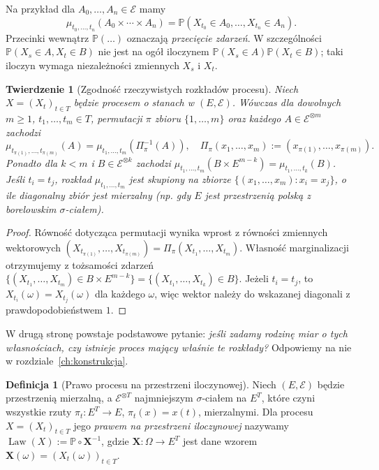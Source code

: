 \documentclass[11pt,a4paper,oneside]{report}
\numberwithin{equation}{chapter}
\theoremstyle{plain}
\newtheorem{twierdzenie}{Twierdzenie}[chapter]
\theoremstyle{definition}
\newtheorem{definicja}{Definicja}[chapter]
\theoremstyle{remark}
\newcommand{\Prob}{\mathbb{P}}
\newcommand{\Law}{\operatorname{Law}}
\newcommand{\calE}{\mathcal{E}}
\begin{document}
Na przykład dla $A_0,\ldots,A_n\in\calE$ mamy
\[
\mu_{t_0,\ldots,t_n}(A_0\times\cdots\times A_n)
=\Prob(X_{t_0}\in A_0,\ldots,X_{t_n}\in A_n).
\]
Przecinki wewnątrz $\Prob(\ldots)$ oznaczają \emph{przecięcie zdarzeń}.
W szczególności $\Prob(X_s\in A,X_t\in B)$ nie jest na ogół
iloczynem $\Prob(X_s\in A)\Prob(X_t\in B)$; taki iloczyn
wymaga niezależności zmiennych $X_s$ i $X_t$.

\begin{twierdzenie}[Zgodność rzeczywistych rozkładów procesu]
Niech $X=(X_t)_{t\in T}$ będzie procesem o stanach w $(E,\calE)$.
Wówczas dla dowolnych $m\ge1$, $t_1,\ldots,t_m\in T$,
permutacji $\pi$ zbioru $\{1,\ldots,m\}$ oraz każdego
$A\in\calE^{\otimes m}$ zachodzi
\[
\mu_{t_{\pi(1)},\ldots,t_{\pi(m)}}(A)
=\mu_{t_1,\ldots,t_m}(\Pi_\pi^{-1}(A)),
\quad
\Pi_\pi(x_1,\ldots,x_m):=(x_{\pi(1)},\ldots,x_{\pi(m)}).
\]
Ponadto dla $k<m$ i $B\in\calE^{\otimes k}$ zachodzi
$\mu_{t_1,\ldots,t_m}(B\times E^{m-k})=\mu_{t_1,\ldots,t_k}(B)$.
Jeśli $t_i=t_j$, rozkład $\mu_{t_1,\ldots,t_m}$ jest skupiony na
zbiorze $\{(x_1,\ldots,x_m):x_i=x_j\}$, o ile diagonalny zbiór jest mierzalny
(np. gdy $E$ jest przestrzenią polską z borelowskim $\sigma$-ciałem).
\end{twierdzenie}
\begin{proof}
Równość dotycząca permutacji wynika wprost z równości zmiennych
wektorowych
$(X_{t_{\pi(1)}},\ldots,X_{t_{\pi(m)}})
=\Pi_\pi(X_{t_1},\ldots,X_{t_m})$.
Własność marginalizacji otrzymujemy z tożsamości zdarzeń
$\{(X_{t_1},\ldots,X_{t_m})\in B\times E^{m-k}\}
=\{(X_{t_1},\ldots,X_{t_k})\in B\}$.
Jeżeli $t_i=t_j$, to $X_{t_i}(\omega)=X_{t_j}(\omega)$
dla każdego $\omega$, więc wektor należy do wskazanej diagonali
z prawdopodobieństwem $1$.
\end{proof}

W drugą stronę powstaje podstawowe pytanie: \emph{jeśli zadamy
rodzinę miar o tych własnościach, czy istnieje proces mający właśnie
te rozkłady?} Odpowiemy na nie w rozdziale~\ref{ch:konstrukcja}.

\begin{definicja}[Prawo procesu na przestrzeni iloczynowej]
Niech $(E,\calE)$ będzie przestrzenią mierzalną, a
$\calE^{\otimes T}$ najmniejszym $\sigma$-ciałem na $E^T$,
które czyni wszystkie rzuty $\pi_t:E^T\to E$, $\pi_t(x)=x(t)$,
mierzalnymi. Dla procesu $X=(X_t)_{t\in T}$ jego
\emph{prawem na przestrzeni iloczynowej} nazywamy
$\Law(X):=\Prob\circ\mathbf X^{-1}$, gdzie
$\mathbf X:\Omega\to E^T$ jest dane wzorem
$\mathbf X(\omega)=(X_t(\omega))_{t\in T}$.
\end{definicja}
\end{document}
